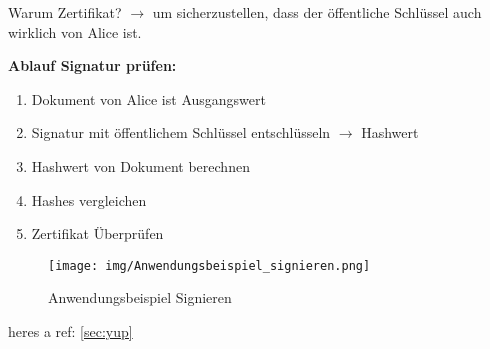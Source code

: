 \documentclass[12pt]{scrartcl}
\begin{document}
Warum Zertifikat? $\rightarrow$ um sicherzustellen, dass der öffentliche Schlüssel auch wirklich
von Alice ist.

\newpage
\textbf{Ablauf Signatur prüfen:}
\begin{enumerate}
    \item Dokument von Alice ist Ausgangswert
    \item Signatur mit öffentlichem Schlüssel entschlüsseln $\rightarrow$ Hashwert
    \item Hashwert von Dokument berechnen
    \item Hashes vergleichen
    \item Zertifikat Überprüfen
\end{enumerate}


\label{sec:yup}
\begin{figure}[ht]
    \centering
    \texttt{[image: img/Anwendungsbeispiel\_signieren.png]}
    \caption{Anwendungsbeispiel Signieren}
    \label{fig:your_label}
\end{figure}


heres a ref: \ref{sec:yup}










\end{document}
